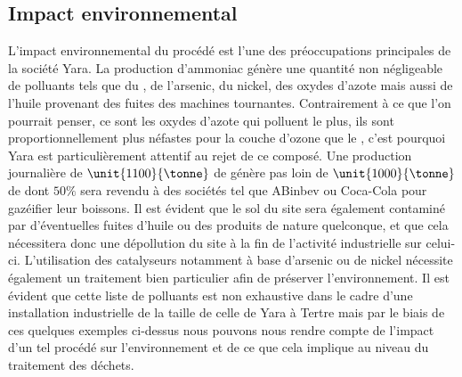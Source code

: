 \subsection*{Impact environnemental}
L'impact environnemental du procédé est l'une des préoccupations principales de la société Yara. La production d'ammoniac génère une quantité non négligeable de polluants tels que du , de l'arsenic, du nickel, des oxydes d'azote mais aussi de l'huile provenant des fuites des machines tournantes. Contrairement à ce que l'on pourrait penser, ce sont les oxydes d'azote
qui polluent le plus, ils sont proportionnellement plus néfastes pour la couche d'ozone que le , c'est pourquoi Yara est particulièrement attentif au rejet de ce composé. Une production journalière de $\unit{1100}{\tonne}$ de  génère pas loin de $\unit {1000}{\tonne}$ de  dont $50 \%$ sera revendu à des sociétés tel que ABinbev ou Coca-Cola pour gazéifier leur boissons. Il est évident que le sol du site sera également contaminé par d'éventuelles fuites d'huile ou des produits de nature quelconque, et que cela nécessitera donc une dépollution du site à la fin de l'activité industrielle sur celui-ci. L'utilisation des catalyseurs notamment à base d'arsenic ou de nickel nécessite également un traitement bien particulier afin de préserver l'environnement. Il est évident que cette liste de polluants est non exhaustive dans le cadre d'une installation industrielle de la taille de celle de Yara à Tertre mais par le biais de ces quelques exemples ci-dessus nous pouvons nous rendre compte de l'impact d'un tel procédé sur l'environnement et de ce que cela implique au niveau du traitement des déchets.


